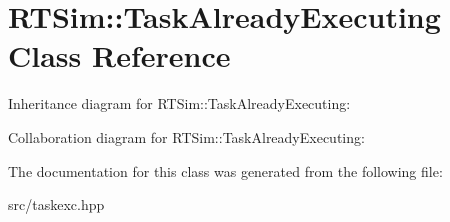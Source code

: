 \hypertarget{classRTSim_1_1TaskAlreadyExecuting}{}\section{R\+T\+Sim\+:\+:Task\+Already\+Executing Class Reference}
\label{classRTSim_1_1TaskAlreadyExecuting}


Inheritance diagram for R\+T\+Sim\+:\+:Task\+Already\+Executing\+:


Collaboration diagram for R\+T\+Sim\+:\+:Task\+Already\+Executing\+:


The documentation for this class was generated from the following file\+:\begin{DoxyCompactItemize}
\item 
src/taskexc.\+hpp\end{DoxyCompactItemize}
